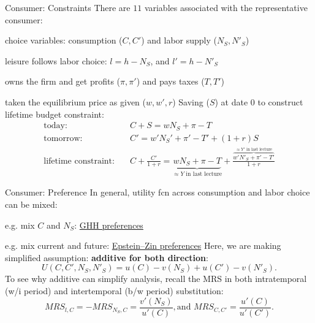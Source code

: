 \documentclass[11pt,aspectratio=169,usenames,dvipsnames]{beamer}
\let\tempone\itemize
\let\temptwo\enditemize
\renewenvironment{itemize}{\tempone\addtolength{\itemsep}{\fill}}{\temptwo}
\begin{document}
\begin{frame}{Consumer: Constraints}
\label{slide:Consumer__Constraints}
There are \alert{$ 11 $} variables associated with the representative consumer:
\begin{itemize}
    \item choice variables: consumption ($C, C'$) and labor supply ($N_{S}, N'_{S}$)
    \begin{itemize}
        \item leisure follows labor choice: $ l = h - N_{S} $, and $ l' = h - N'_{S} $
    \end{itemize}
    \item owns the firm and get profits ($ \pi, \pi' $) and pays taxes ($T, T'$)
    \item taken the equilibrium price as given ($w, w', r$)
\end{itemize}
%
Saving ($S$) at date 0 to construct lifetime budget constraint:
\begin{align*}
    \text{today:} \quad
        & C + S = w N_{S} + \pi - T
    \\
    \text{tomorrow:} \quad
        & C' = w' N_{S}' + \pi' - T' + ( 1+r ) S
    \\
    \text{lifetime constraint:} \quad
        & C + \frac{C'}{1+r} =
            \underbrace{w N_{S} + \pi - T}_{\approx Y \text{ in last lecture}}
            + \frac{\overbrace{w' N'_{S} + \pi' - T'}^{\approx Y' \text{ in last lecture}}}{1+r}
\end{align*}
%
\end{frame}

\begin{frame}{Consumer: Preference}
\label{slide:Consumer__Preference}
    In general, utility fcn across consumption and labor choice can be mixed:
    \begin{itemize}
        \item e.g. mix $ C $ and $ N_{S} $: \alert{\href{https://tinyurl.com/222w66m9}{GHH preferences}}
        \item e.g. mix current and future: \alert{\href{https://tinyurl.com/2p8a9bb5}{Epstein–Zin preferences}}
    \end{itemize}
    Here, we are making simplified assumption: \textbf{additive for both direction}:
    \begin{equation}
    \label{eq:utility_function}
        U( C, C', N_{S}, N'_{S} ) = u( C ) - v( N_{S}) + u( C' ) - v( N'_{S} )
    .\end{equation}
    To see why \alert{additive} can simplify analysis, recall the MRS in both \alert{intratemporal} (w/i period) and \alert{intertemporal} (b/w period) substitution:
    \begin{equation*}
        MRS_{l, C} = - MRS_{N_{S}, C} = \frac{v'( N_{S} )}{u'( C )}, \text{and } MRS_{C, C'} = \frac{u'( C )}{u'( C' )}
    .\end{equation*}
\end{frame}
\end{document}
